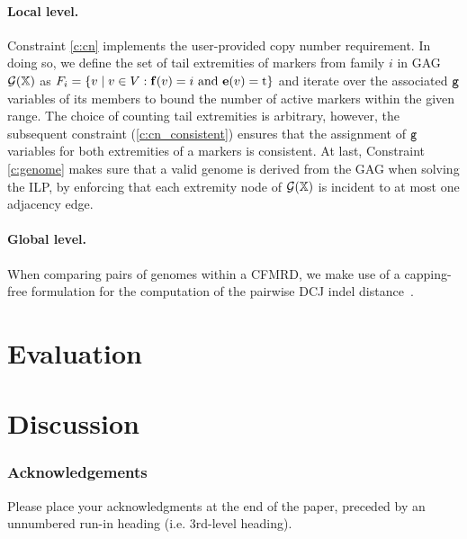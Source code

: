 \documentclass[runningheads]{llncs}
\begin{document}
\paragraph{Local level.} 
Constraint \ref{c:cn} implements the user-provided copy number requirement. 
In doing so, we define the set of tail extremities of markers from family $i$ in GAG $\mathcal{G}(\mathbb{X})$ as $F_i = \{ v \mid v \in V: \mathbf{f}(v) = i \text{ and } \mathbf{e}(v) = \textnormal{t}\}$ and iterate over the associated ${\texttt{g}}$ variables of its members to bound the number of active markers within the given range. 
The choice of counting tail extremities is arbitrary, however, the subsequent constraint (\ref{c:cn_consistent}) ensures that the assignment of ${\texttt{g}}$ variables for both extremities of a markers is consistent. 
At last, Constraint \ref{c:genome} makes sure that a valid genome is derived from the GAG when solving the ILP, by enforcing that each extremity node of $\mathcal{G}(\mathbb{X})$ is incident to at most one adjacency edge. 

\paragraph{Global level.}

When comparing pairs of genomes within a CFMRD, we make use of a capping-free formulation for the computation of the pairwise DCJ indel distance~\cite{BOH-2023}.






\section{Evaluation}
\section{Discussion}



\subsubsection{Acknowledgements} Please place your acknowledgments at
the end of the paper, preceded by an unnumbered run-in heading (i.e.
3rd-level heading).

%
%
%


\end{document}
